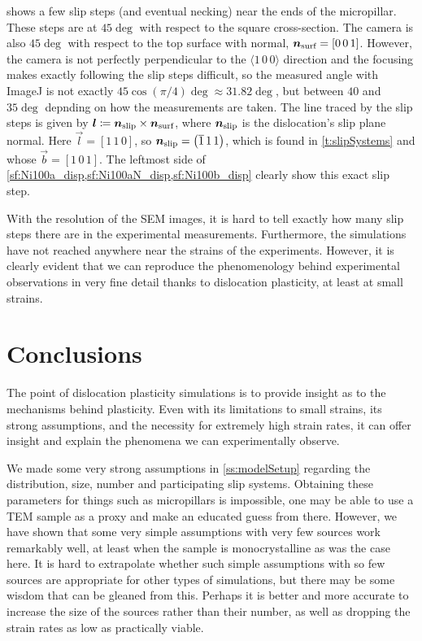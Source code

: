  shows a few slip steps (and eventual necking) near the ends of the micropillar. These steps are at $45 \deg$ with respect to the square cross-section. The camera is also $45 \deg$ with respect to the top surface with normal, $\vec{n}_\rvar{surf} = [0\, 0\, 1]$. However, the camera is not perfectly perpendicular to the $\langle 1\, 0\, 0 \rangle$ direction and the focusing makes exactly following the slip steps difficult, so the measured angle with ImageJ \cite{imagej} is not exactly $45 \cos(\pi/4) \deg \approx 31.82 \deg$, but between $40$ and $35 \deg$ depnding on how the measurements are taken. The line traced by the slip steps is given by $\vec{l} \coloneqq \vec{n}_\rvar{slip} \times \vec{n}_\rvar{surf}$, where $\vec{n}_\rvar{slip}$ is the dislocation's slip plane normal. Here $\vec{l} = [1\, 1\, 0]$, so $\vec{n}_\rvar{slip} = \left(\overline{1}\, 1\, 1\right)$, which is found in \cref{t:slipSystems} and whose $\vec{b} = [1\, 0\, 1]$. The leftmost side of \cref{sf:Ni100a_disp,sf:Ni100aN_disp,sf:Ni100b_disp} clearly show this exact slip step.

With the resolution of the SEM images, it is hard to tell exactly how many slip steps there are in the experimental measurements. Furthermore, the simulations have not reached anywhere near the strains of the experiments. However, it is clearly evident that we can reproduce the phenomenology behind experimental observations in very fine detail thanks to dislocation plasticity, at least at small strains.

\section{Conclusions}
\label{s:concSim}

The point of dislocation plasticity simulations is to provide insight as to the mechanisms behind plasticity. Even with its limitations to small strains, its strong assumptions, and the necessity for extremely high strain rates, it can offer insight and explain the phenomena we can experimentally observe.

We made some very strong assumptions in \cref{ss:modelSetup} regarding the distribution, size, number and participating slip systems. Obtaining these parameters for things such as micropillars is impossible, one may be able to use a TEM sample as a proxy and make an educated guess from there. However, we have shown that some very simple assumptions with very few sources work remarkably well, at least when the sample is monocrystalline as was the case here. It is hard to extrapolate whether such simple assumptions with so few sources are appropriate for other types of simulations, but there may be some wisdom that can be gleaned from this. Perhaps it is better and more accurate to increase the size of the sources rather than their number, as well as dropping the strain rates as low as practically viable.

